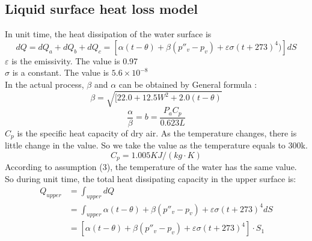 \documentclass{mcmthesis}
\begin{document}
\subsection{Liquid surface heat loss model}
\indent In unit time, the heat dissipation of the water surface is \cite{1}
\begin{equation}
 dQ=dQ_{a}+dQ_{b}+dQ_{c}=[\alpha (t-\theta)+\beta ({p}''_{v}-p_{v})+\varepsilon \sigma (t+273)^{4})]dS 
\end{equation}
\indent \indent \indent $\varepsilon$ is the emissivity. The value is 0.97\\
\indent \indent \indent $\sigma$ is a constant. The value is $5.6\times 10^{-8}$\\
\indent \indent \indent In the actual process, $\beta$ and $\alpha$ can be obtained by General formula \cite{2}:\\
\begin{equation}
 \beta=\sqrt{[22.0+12.5W^{2}+2.0(t-\theta)}
\end{equation}
\begin{equation}
 \frac{\alpha}{\beta}=b=\frac{P_{a}C_{p}}{0.623L}
\end{equation}
\indent $C_{p}$ is the specific heat capacity of dry air. As the temperature changes, there is little change in the value. So we take the value as the temperature equals to 300k.\\
\begin{equation}
C_{p}=1.005KJ/(kg\cdot K)
\end{equation}
\indent According to assumption (3), the temperature of the water has the same value. So during unit time, the total heat dissipating capacity in the upper surface is:\\
\begin{equation}
\begin{split}
Q_{upper}&=\int_{upper} dQ\\
&= \int_{upper}\alpha (t-\theta)+\beta ({p}''_{v}-p_{v})+\varepsilon \sigma (t+273)^{4}dS	\\
&=[\alpha (t-\theta)+\beta ({p}''_{v}-p_{v})+\varepsilon \sigma (t+273)^{4}]\cdot S_{1}\
\end{split}
\end{equation}
\end{document}
